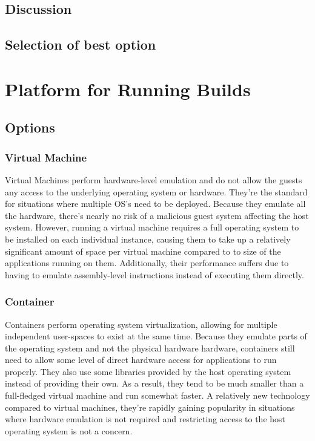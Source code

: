 \documentclass[10pt,letterpaper,onecolumn,journal]{IEEEtran}
\begin{document}
\subsection{Discussion}
\subsection{Selection of best option}

\section{Platform for Running Builds}
\subsection{Options}
\subsubsection{Virtual Machine}
Virtual Machines perform hardware-level emulation and do not allow the guests any access to the underlying operating system or hardware. They're the standard for situations where multiple OS's need to be deployed. Because they emulate all the hardware, there's nearly no risk of a malicious guest system affecting the host system. However, running a virtual machine requires a full operating system to be installed on each individual instance, causing them to take up a relatively significant amount of space per virtual machine compared to to size of the applications running on them. Additionally, their performance suffers due to having to emulate assembly-level instructions instead of executing them directly.
\subsubsection{Container}
Containers perform operating system virtualization, allowing for multiple independent user-spaces to exist at the same time. Because they emulate parts of the operating system and not the physical hardware hardware, containers still need to allow some level of direct hardware access for applications to run properly. They also use some libraries provided by the host operating system instead of providing their own. As a result, they tend to be much smaller than a full-fledged virtual machine and run somewhat faster. A relatively new technology compared to virtual machines, they're rapidly gaining popularity in situations where hardware emulation is not required and restricting access to the host operating system is not a concern.
\end{document}
